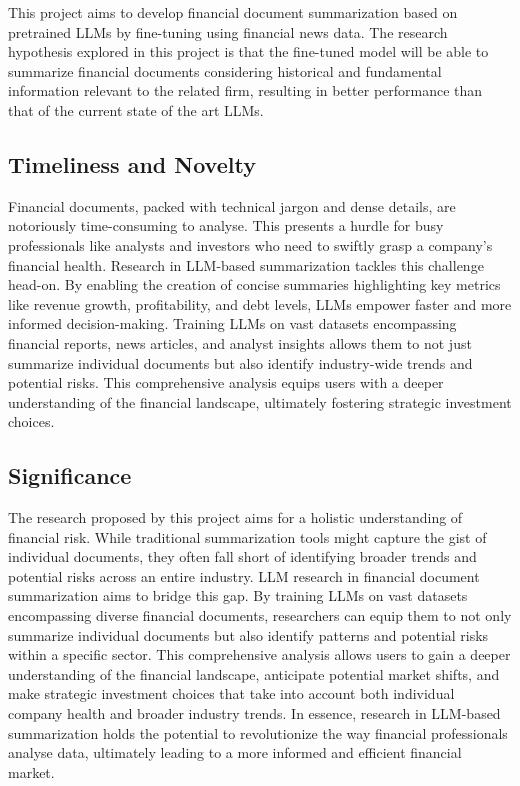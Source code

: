 This project aims to develop financial document summarization based on pretrained LLMs by fine-tuning using financial news
data.
The research hypothesis explored in this project is that the fine-tuned model will be able to summarize financial
documents considering historical and fundamental information relevant to the related firm, resulting in better
performance than that of the current state of the art LLMs.

\subsection{Timeliness and Novelty}\label{subsec:timeliness-and-novelty}

Financial documents, packed with technical jargon and dense details, are notoriously time-consuming to analyse.
This presents a hurdle for busy professionals like analysts and investors who need to swiftly grasp a company's
financial health.
Research in LLM-based summarization tackles this challenge head-on.
By enabling the creation of concise summaries highlighting key metrics like revenue growth, profitability, and debt
levels, LLMs empower faster and more informed decision-making.
Training LLMs on vast datasets encompassing financial reports, news articles, and analyst insights allows them to not
just summarize individual documents but also identify industry-wide trends and potential risks.
This comprehensive analysis equips users with a deeper understanding of the financial landscape, ultimately fostering
strategic investment choices.

\subsection{Significance}\label{subsec:significance}

The research proposed by this project aims for a holistic understanding of financial risk.
While traditional summarization tools might capture the gist of individual documents, they often fall short of
identifying broader trends and potential risks across an entire industry.
LLM research in financial document summarization aims to bridge this gap.
By training LLMs on vast datasets encompassing diverse financial documents, researchers can equip them to not only
summarize individual documents but also identify patterns and potential risks within a specific sector.
This comprehensive analysis allows users to gain a deeper understanding of the financial landscape, anticipate
potential market shifts, and make strategic investment choices that take into account both individual company health
and broader industry trends.
In essence, research in LLM-based summarization holds the potential to revolutionize the way financial professionals
analyse data, ultimately leading to a more informed and efficient financial market.

